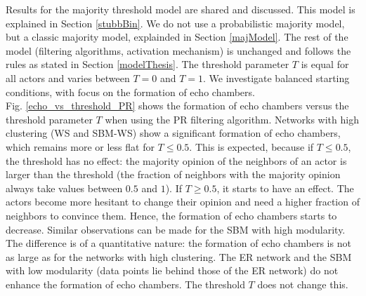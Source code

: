 \documentclass[11 pt , letterpaper , twoside , openright]{book}
\begin{document}
Results for the majority threshold model are shared and discussed. This model is explained in Section \ref{stubbBin}. We do not use a probabilistic majority model, but a classic majority model, explainded in Section \ref{majModel}. The rest of the model (filtering algorithms, activation mechanism) is unchanged and follows the rules as stated in Section \ref{modelThesis}. The threshold parameter $T$ is equal for all actors and varies between $T=0$ and $T=1$. We investigate balanced starting conditions, with focus on the formation of echo chambers.\\
\newline
Fig. \ref{echo_vs_threshold_PR} shows the formation of echo chambers versus the threshold parameter $T$ when using the PR filtering algorithm. Networks with high clustering (WS and SBM-WS) show a significant formation of echo chambers, which remains more or less flat for $T \leqslant 0.5$. This is expected, because if $T \leqslant 0.5$, the threshold has no effect: the majority opinion of the neighbors of an actor is larger than the threshold (the fraction of neighbors with the majority opinion always take values between $0.5$ and $1$). If $T \geqslant 0.5$, it starts to have an effect. The actors become more hesitant to change their opinion and need a higher fraction of neighbors to convince them. Hence, the formation of echo chambers starts to decrease. Similar observations can be made for the SBM with high modularity. The difference is of a quantitative nature: the formation of echo chambers is not as large as for the networks with high clustering. The ER network and the SBM with low modularity (data points lie behind those of the ER network) do not enhance the formation of echo chambers. The threshold $T$ does not change this. 
\end{document}
